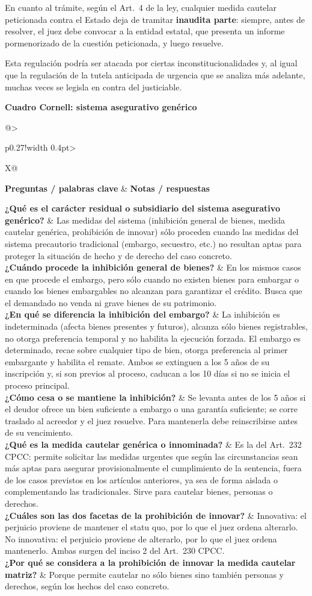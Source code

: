 \documentclass[12pt,oneside]{book}
\makeatletter
\newcommand{\cornelltitle}[1]{\par\bigskip\noindent\textbf{\sffamily Cuadro Cornell: #1}\par\nopagebreak\smallskip}
\newcommand{\cqrow}[2]{\textbf{#1} & #2 \\[0.5em]}
\newcommand{\cornellblock}[1]{%
  \noindent\begin{tabularx}{\textwidth}{@{}>{\raggedright\arraybackslash}p{0.27\textwidth}!{\vrule width 0.4pt}>{\raggedright\arraybackslash}X@{}}
  \toprule
  \textbf{Preguntas / palabras clave} & \textbf{Notas / respuestas} \\
  \midrule
  #1
  \bottomrule
  \end{tabularx}\par}
\makeatother
\begin{document}
En cuanto al trámite, según el Art.~4 de la ley, cualquier medida cautelar peticionada contra el Estado deja de tramitar \textbf{inaudita parte}: siempre, antes de resolver, el juez debe convocar a la entidad estatal, que presenta un informe pormenorizado de la cuestión peticionada, y luego resuelve.

Esta regulación podría ser atacada por ciertas inconstitucionalidades y, al igual que la regulación de la tutela anticipada de urgencia que se analiza más adelante, muchas veces se legisla en contra del justiciable.

\cornelltitle{sistema asegurativo genérico}
\cornellblock{
\cqrow{¿Qué es el carácter residual o subsidiario del sistema asegurativo genérico?}{Las medidas del sistema (inhibición general de bienes, medida cautelar genérica, prohibición de innovar) sólo proceden cuando las medidas del sistema precautorio tradicional (embargo, secuestro, etc.) no resultan aptas para proteger la situación de hecho y de derecho del caso concreto.
}
\cqrow{¿Cuándo procede la inhibición general de bienes?}{En los mismos casos en que procede el embargo, pero sólo cuando no existen bienes para embargar o cuando los bienes embargables no alcanzan para garantizar el crédito. Busca que el demandado no venda ni grave bienes de su patrimonio.
}
\cqrow{¿En qué se diferencia la inhibición del embargo?}{La inhibición es indeterminada (afecta bienes presentes y futuros), alcanza sólo bienes registrables, no otorga preferencia temporal y no habilita la ejecución forzada. El embargo es determinado, recae sobre cualquier tipo de bien, otorga preferencia al primer embargante y habilita el remate. Ambos se extinguen a los 5 años de su inscripción y, si son previos al proceso, caducan a los 10 días si no se inicia el proceso principal.
}
\cqrow{¿Cómo cesa o se mantiene la inhibición?}{Se levanta antes de los 5 años si el deudor ofrece un bien suficiente a embargo o una garantía suficiente; se corre traslado al acreedor y el juez resuelve. Para mantenerla debe reinscribirse antes de su vencimiento.
}
\cqrow{¿Qué es la medida cautelar genérica o innominada?}{Es la del Art.~232 CPCC: permite solicitar las medidas urgentes que según las circunstancias sean más aptas para asegurar provisionalmente el cumplimiento de la sentencia, fuera de los casos previstos en los artículos anteriores, ya sea de forma aislada o complementando las tradicionales. Sirve para cautelar bienes, personas o derechos.
}
\cqrow{¿Cuáles son las dos facetas de la prohibición de innovar?}{Innovativa: el perjuicio proviene de mantener el statu quo, por lo que el juez ordena alterarlo. No innovativa: el perjuicio proviene de alterarlo, por lo que el juez ordena mantenerlo. Ambas surgen del inciso 2 del Art.~230 CPCC.
}
\cqrow{¿Por qué se considera a la prohibición de innovar la medida cautelar matriz?}{Porque permite cautelar no sólo bienes sino también personas y derechos, según los hechos del caso concreto.
}
}
\end{document}
